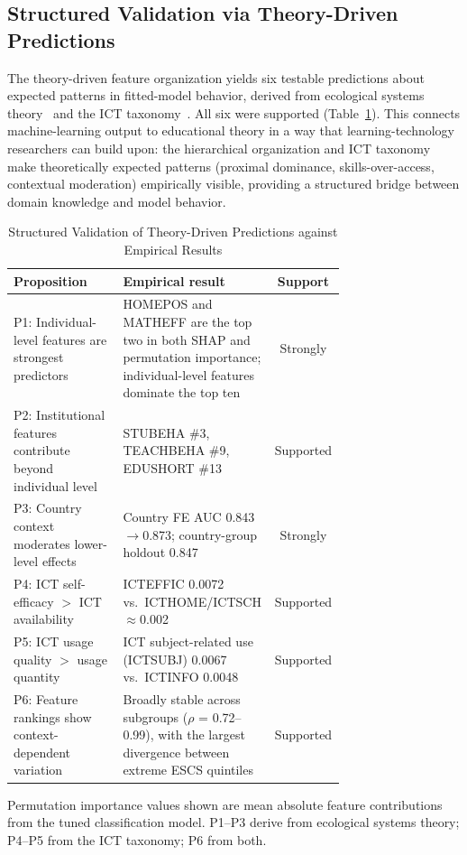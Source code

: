 \documentclass[journal]{IEEEtran}
\begin{document}
\subsection{Structured Validation via Theory-Driven Predictions}
The theory-driven feature organization yields six testable predictions about expected patterns in fitted-model behavior, derived from ecological systems theory~\cite{Bronfenbrenner_1979,Bronfenbrenner_1994} and the ICT taxonomy~\cite{van_Dijk_2005,van_Dijk_2020}. All six were supported (Table~\ref{tab:propositions}). This connects machine-learning output to educational theory in a way that learning-technology researchers can build upon: the hierarchical organization and ICT taxonomy make theoretically expected patterns (proximal dominance, skills-over-access, contextual moderation) empirically visible, providing a structured bridge between domain knowledge and model behavior.

\begin{table}[!t]
\centering
\caption{Structured Validation of Theory-Driven Predictions against Empirical Results}
\label{tab:propositions}
\footnotesize
\begin{tabular}{@{}p{0.33\linewidth}p{0.40\linewidth}c@{}}
\toprule
\textbf{Proposition} & \textbf{Empirical result} & \textbf{Support} \\
\midrule
P1: Individual-level features are strongest predictors & HOMEPOS and MATHEFF are the top two in both SHAP and permutation importance; individual-level features dominate the top ten & Strongly \\
P2: Institutional features contribute beyond individual level & STUBEHA \#3, TEACHBEHA \#9, EDUSHORT \#13 & Supported \\
P3: Country context moderates lower-level effects & Country FE AUC 0.843$\to$0.873; country-group holdout 0.847 & Strongly \\
P4: ICT self-efficacy $>$ ICT availability & ICTEFFIC 0.0072 vs.\ ICTHOME/ICTSCH $\approx$0.002 & Supported \\
P5: ICT usage quality $>$ usage quantity & ICT subject-related use (ICTSUBJ) 0.0067 vs.\ ICTINFO 0.0048 & Supported \\
P6: Feature rankings show context-dependent variation & Broadly stable across subgroups ($\rho$ = 0.72--0.99), with the largest divergence between extreme ESCS quintiles & Supported \\
\bottomrule
\end{tabular}
\vspace{2pt}
{\footnotesize Permutation importance values shown are mean absolute feature contributions from the tuned classification model. P1--P3 derive from ecological systems theory; P4--P5 from the ICT taxonomy; P6 from both.}
\end{table}
\end{document}
